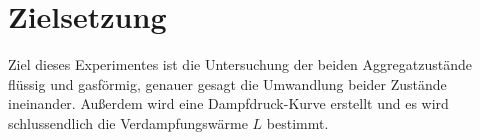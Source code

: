 \section{Zielsetzung}
\label{sec:Zielsetzung}

Ziel dieses Experimentes ist die Untersuchung der beiden Aggregatzustände flüssig und gasförmig, genauer gesagt die Umwandlung beider Zustände ineinander.
Außerdem wird eine Dampfdruck-Kurve erstellt und es wird schlussendlich die Verdampfungswärme $L$ bestimmt.